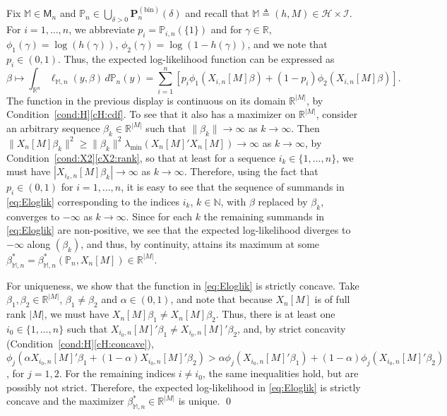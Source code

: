 \documentclass[preprint]{imsart}
\newcommand{\R}{{\mathbb R}}
\renewcommand{\P}{{\mathbb P}}
\newcommand{\N}{{\mathbb N}}
\newcommand{\M}{\mathbb M}
\newcommand{\lmin}{\lambda_{\min}}
\numberwithin{equation}{section}
\begin{document}
Fix $\M\in\mathsf{M}_n$ and $\P_n\in\bigcup_{\delta>0}\mathbf{P}_n^{(\mathrm{bin})}(\delta)$ and recall that $\M\triangleq (h,M)\in \mathcal H\times \mathcal I$. For $i=1,\dots, n$, we abbreviate $p_i = \P_{i,n}(\{1\})$ and for $\gamma\in\R$, $\phi_1(\gamma) = \log(h(\gamma))$, $\phi_2(\gamma) = \log(1-h(\gamma))$, and we note that $p_i\in(0,1)$. Thus, the expected log-likelihood function can be expressed as
\begin{equation}\label{eq:Eloglik}
\beta \mapsto \int_{\R^n}\ell_{\M,n}(y,\beta)\,d\P_n(y) = \sum_{i=1}^n \left[p_i\phi_1(X_{i,n}[M]\beta) + (1-p_i)\phi_2(X_{i,n}[M]\beta)\right].
\end{equation}
The function in the previous display is continuous on its domain $\R^{|M|}$, by Condition~\ref{cond:H}\eqref{cH:cdf}. To see that it also has a maximizer on $\R^{|M|}$, consider an arbitrary sequence $\beta_k\in\R^{|M|}$ such that $\|\beta_k\|\to\infty$ as $k\to\infty$. Then $\|X_n[M]\beta_k\|^2 \ge \|\beta_k\|^2 \lmin(X_n[M]'X_n[M]) \to \infty$ as $k\to \infty$, by Condition~\ref{cond:X2}\eqref{cX2:rank}, so that at least for a sequence $i_k\in\{1,\dots, n\}$, we must have $|X_{i_k,n}[M]\beta_k|\to \infty$ as $k\to\infty$. Therefore, using the fact that $p_i\in(0,1)$ for $i=1,\dots, n$, it is easy to see that the sequence of summands in \eqref{eq:Eloglik} corresponding to the indices $i_k$, $k\in\N$, with $\beta$ replaced by $\beta_k$, converges to $-\infty$ as $k\to \infty$. Since for each $k$ the remaining summands in \eqref{eq:Eloglik} are non-positive, we see that the expected log-likelihood diverges to $-\infty$ along $(\beta_k)$, and thus, by continuity, attains its maximum at some $\beta_{\M,n}^*=\beta_{\M,n}^*(\P_n,X_n[M])\in\R^{|M|}$. 

For uniqueness, we show that the function in \eqref{eq:Eloglik} is strictly concave.
Take $\beta_1,\beta_2\in\R^{|M|}$, $\beta_1\ne\beta_2$ and $\alpha\in(0,1)$, and note that because $X_n[M]$ is of full rank $|M|$, we must have $X_n[M]\beta_1\ne X_n[M]\beta_2$. Thus, there is at least one $i_0\in\{1,\dots, n\}$ such that $X_{i_0,n}[M]'\beta_1 \ne X_{i_0,n}[M]'\beta_2$, and, by strict concavity (Condition~\ref{cond:H}\eqref{cH:concave}), $\phi_j(\alpha X_{i_0,n}[M]'\beta_1 + (1-\alpha)X_{i_0,n}[M]'\beta_2)> \alpha\phi_j( X_{i_0,n}[M]'\beta_1) + (1-\alpha) \phi_j( X_{i_0,n}[M]'\beta_2)$, for $j=1,2$. For the remaining indices $i\ne i_0$, the same inequalities hold, but are possibly not strict. Therefore, the expected log-likelihood in \eqref{eq:Eloglik} is strictly concave and the maximizer $\beta_{\M,n}^*\in\R^{|M|}$ is unique. \hfill{\qed}
\end{document}
